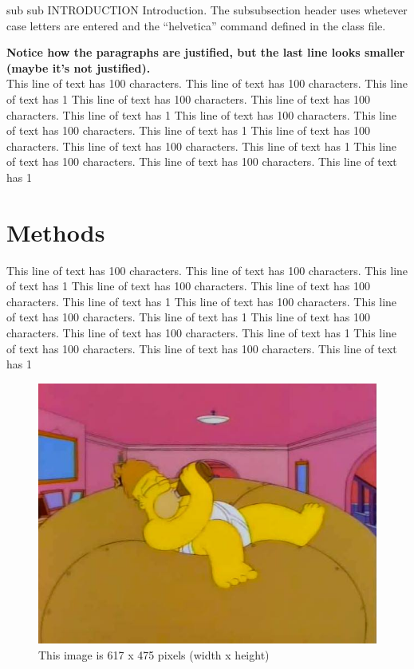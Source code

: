 \documentclass[utf8]{test_class}
\begin{document}
sub sub INTRODUCTION Introduction. The subsubsection header uses whetever case letters are entered
and the ``helvetica'' command defined in the class file.

\textbf{Notice how the paragraphs are justified, but the last line looks smaller (maybe it's not justified).}\\
This line of text has 100 characters. This line of text has 100 characters. This line of text has 1 
This line of text has 100 characters. This line of text has 100 characters. This line of text has 1 
This line of text has 100 characters. This line of text has 100 characters. This line of text has 1 
This line of text has 100 characters. This line of text has 100 characters. This line of text has 1 
This line of text has 100 characters. This line of text has 100 characters. This line of text has 1 

\section{Methods}\label{methods}

This line of text has 100 characters. This line of text has 100 characters. This line of text has 1 
This line of text has 100 characters. This line of text has 100 characters. This line of text has 1 
This line of text has 100 characters. This line of text has 100 characters. This line of text has 1 
This line of text has 100 characters. This line of text has 100 characters. This line of text has 1 
This line of text has 100 characters. This line of text has 100 characters. This line of text has 1 


\begin{figure}[htbp]
        \begin{center}
        \includegraphics[width=\linewidth]{homer_giant_donut.jpg}
        \end{center}
    \caption{ This image is 617 x 475 pixels (width x height) }\label{fig:homer_giant_donut}
\end{figure}
\end{document}
